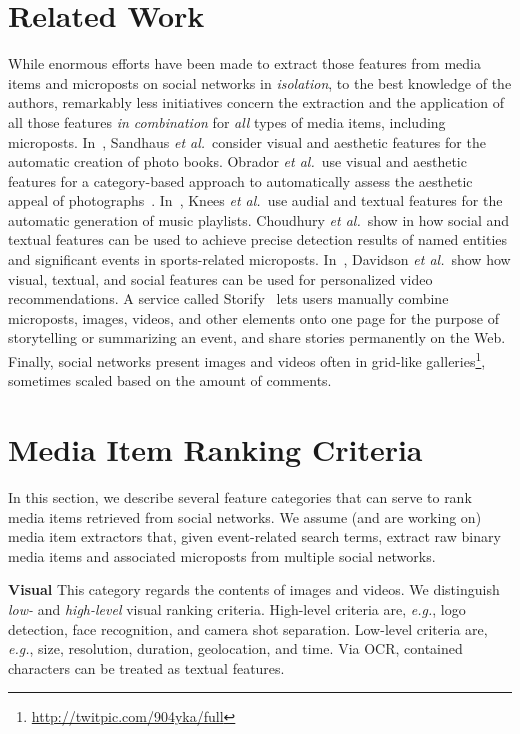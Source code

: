 \documentclass{article}
\let\oldsection\section
\renewcommand{\section}[1]{\oldsection{#1}\vspace{-1em}}
\begin{document}
\section{Related Work}
While enormous efforts have been made to extract those features
from media items and microposts on social networks in \emph{isolation},
to the best knowledge of the authors, remarkably less initiatives 
concern the extraction and the application
of all those features \emph{in combination}
for \emph{all} types of media items, including microposts.
In~\cite{Photo2011}, Sandhaus \emph{et al.}\ consider visual and
aesthetic features for the automatic creation of photo books.
Obrador \emph{et al.}\ use visual and aesthetic features
for a category-based approach to automatically assess
the aesthetic appeal of photographs~\cite{Photo2012}.
In~\cite{Playlist2006}, Knees \emph{et al.}\ use audial and textual
features for the automatic generation of music playlists.
Choudhury \emph{et al.}\ show in \cite{Sports2011} how social and textual
features can be used to achieve precise detection results 
of named entities and significant events in sports-related microposts.
In~\cite{YouTube2010}, Davidson \emph{et al.}\ show how visual,
textual, and social features can be used for personalized video recommendations.
A service called Storify~\cite{Storify2011} lets users manually combine
microposts, images, videos, and other elements onto one page for the purpose
of storytelling or summarizing an event,
and share stories permanently on the Web.
Finally, social networks present images and videos
often in grid-like galleries\footnote{\url{http://twitpic.com/904yka/full}}, sometimes scaled
based on the amount of comments.

\section{Media Item Ranking Criteria}
In this section, we describe several feature categories that can serve to rank
media items retrieved from social networks. 
We assume (and are working on) media item extractors that,
given event-related search terms,
extract raw binary media items and associated microposts
from multiple social networks.

\noindent \textbf{Visual}
This category regards the contents of images and videos.
We distinguish \emph{low-} and \emph{high-level} visual ranking criteria.
High-level criteria are, \emph{e.g.}, logo detection,
face recognition, and camera shot separation.
Low-level criteria are, \emph{e.g.}, size, resolution,
duration, geolocation, and time.
Via OCR, contained characters can be treated as textual features.
\end{document}
